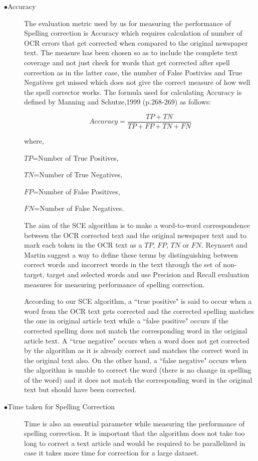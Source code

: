\documentclass[12pt]{article}
\begin{document}
\begin{description}

 \item[$\bullet$Accuracy]
 The evaluation metric used by us for measuring the performance of Spelling correction is Accuracy which requires calculation of number of OCR errors that get corrected when compared to the original newspaper text. The measure has been chosen so as to include the complete text coverage and not just check for words that get corrected after spell correction as in the latter case, the  number of False Postivies and True Negatives get missed which does not give the correct measure of how well the spell corrector works. The formula used for calculating Accuracy is defined by Manning and Schutze,1999 (p.268-269) as follows:

$$Accuracy=  \dfrac{TP+TN} {TP+ FP + TN + FN}$$


where, 

$TP$=Number of True Positives,

$TN$=Number of True Negatives,

 $FP$=Number of False Positives,

 $FN$=Number of False Negatives. 

The aim of the SCE algorithm is to make a word-to-word correspondence between the OCR corrected text and the original newspaper text and to mark each token in the OCR text as a $TP$, $FP$, $TN$ or $FN$. Reynaert and Martin\cite{reynaert2008all} suggest a way to define these terms by distinguishing between correct words and incorrect words in the text through the set of non-target, target and selected words and use Precision and Recall evaluation measures for measuring performance of spelling correction. 

According to our SCE algorithm, a ``true positive" is said to occur when a word from the OCR text gets corrected and the corrected spelling matches the one in original article text while a ``false positive" occurs if the corrected spelling does not match the corresponding word in the original article text. A ``true negative" occurs when a word does not get corrected by the algorithm as it is already correct and matches the correct word in the original text also. On the other hand, a ``false negative" occurs when the algorithm is unable to correct the word (there is no change in spelling of the word) and it does not match the corresponding word in the original text but should have been corrected.

\item[$\bullet$Time taken for Spelling Correction]
Time is also an essential parameter while measuring the performance of spelling correction. It is important that the algorithm does not take too long to correct a text article and would be required to be parallelized in case it takes more time for correction for a large dataset.

\end{description}
\end{document}
